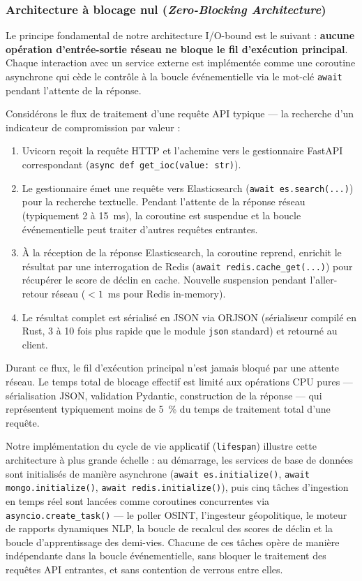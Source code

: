 \subsubsection{Architecture à blocage nul (\textit{Zero-Blocking Architecture})}

Le principe fondamental de notre architecture I/O-bound est le suivant : \textbf{aucune opération d'entrée-sortie réseau ne bloque le fil d'exécution principal}. Chaque interaction avec un service externe est implémentée comme une coroutine asynchrone qui cède le contrôle à la boucle événementielle via le mot-clé \texttt{await} pendant l'attente de la réponse.

Considérons le flux de traitement d'une requête API typique --- la recherche d'un indicateur de compromission par valeur :

\begin{enumerate}
    \item Uvicorn reçoit la requête HTTP et l'achemine vers le gestionnaire FastAPI correspondant (\texttt{async def get\_ioc(value: str)}).
    \item Le gestionnaire émet une requête vers Elasticsearch (\texttt{await es.search(...)}) pour la recherche textuelle. Pendant l'attente de la réponse réseau (typiquement 2 à 15~ms), la coroutine est suspendue et la boucle événementielle peut traiter d'autres requêtes entrantes.
    \item À la réception de la réponse Elasticsearch, la coroutine reprend, enrichit le résultat par une interrogation de Redis (\texttt{await redis.cache\_get(...)}) pour récupérer le score de déclin en cache. Nouvelle suspension pendant l'aller-retour réseau ($<1$~ms pour Redis in-memory).
    \item Le résultat complet est sérialisé en JSON via ORJSON (sérialiseur compilé en Rust, 3 à 10 fois plus rapide que le module \texttt{json} standard) et retourné au client.
\end{enumerate}

Durant ce flux, le fil d'exécution principal n'est jamais bloqué par une attente réseau. Le temps total de blocage effectif est limité aux opérations CPU pures --- sérialisation JSON, validation Pydantic, construction de la réponse --- qui représentent typiquement moins de 5~\% du temps de traitement total d'une requête.

Notre implémentation du cycle de vie applicatif (\texttt{lifespan}) illustre cette architecture à plus grande échelle : au démarrage, les services de base de données sont initialisés de manière asynchrone (\texttt{await es.initialize()}, \texttt{await mongo.initialize()}, \texttt{await redis.initialize()}), puis cinq tâches d'ingestion en temps réel sont lancées comme coroutines concurrentes via \texttt{asyncio.create\_task()} --- le poller OSINT, l'ingesteur géopolitique, le moteur de rapports dynamiques NLP, la boucle de recalcul des scores de déclin et la boucle d'apprentissage des demi-vies. Chacune de ces tâches opère de manière indépendante dans la boucle événementielle, sans bloquer le traitement des requêtes API entrantes, et sans contention de verrous entre elles.

